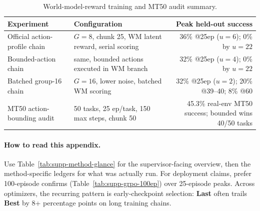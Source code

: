 \begin{table}[H]
\centering
\caption{World-model-reward training and MT50 audit summary.}
\label{tab:supp-wm-audit}
\small
\begin{tabularx}{\linewidth}{@{}l X r@{}}
\toprule
Experiment & Configuration & Peak held-out success \\
\midrule
Official action-profile chain & $G{=}8$, chunk 25, WM latent reward, serial scoring & 36\% @25ep ($u{=}6$); 0\% by $u{=}22$ \\
Bounded-action chain & same, bounded actions executed in WM branch & 32\% @25ep ($u{=}4$); 0\% by $u{=}22$ \\
Batched group-16 chain & $G{=}16$, lower noise, batched WM scoring & 32\% @25ep ($u{=}2$); 20\% @39--40; 8\% @60 \\
MT50 action-bounding audit & 50 tasks, 25 ep/task, 150 max steps, chunk 50 & 45.3\% real-env MT50 success; bounded wins 40/50 tasks \\
\bottomrule
\end{tabularx}
\end{table}

\paragraph{How to read this appendix.}
Use Table~\ref{tab:supp-method-glance} for the supervisor-facing overview, then the method-specific ledgers for what was actually run. For deployment claims, prefer 100-episode confirms (Table~\ref{tab:supp-grpo-100ep}) over 25-episode peaks. Across optimizers, the recurring pattern is early-checkpoint selection: \textbf{Last} often trails \textbf{Best} by 8+ percentage points on long training chains.
